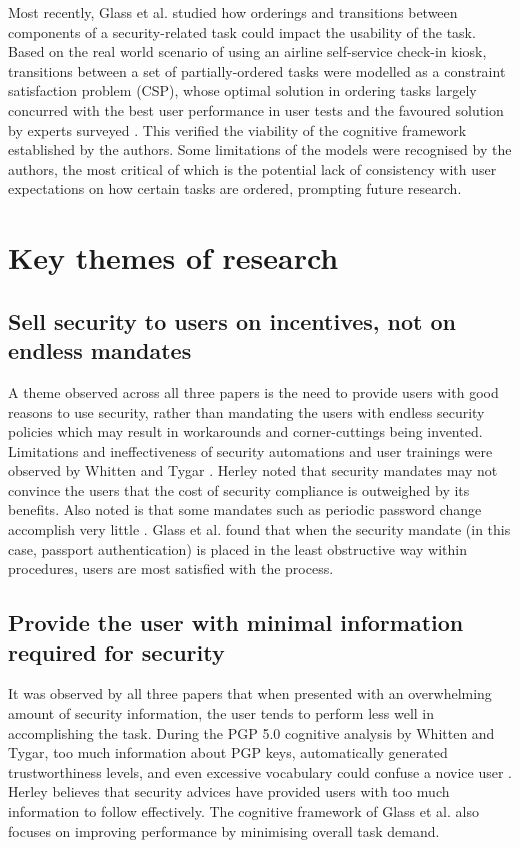 \documentclass[11pt]{article}
\begin{document}
Most recently, Glass et al. \cite{glass2016usability} studied how orderings and transitions between components of a security-related task could impact the usability of the task. Based on the real world scenario of using an airline self-service check-in kiosk, transitions between a set of partially-ordered tasks were modelled as a constraint satisfaction problem (CSP), whose optimal solution in ordering tasks largely concurred with the best user performance in user tests and the favoured solution by experts surveyed \cite[Fig. 7]{glass2016usability}. This verified the viability of the cognitive framework established by the authors. Some limitations of the models were recognised by the authors, the most critical of which is the potential lack of consistency with user expectations on how certain tasks are ordered, prompting future research.

\section{Key themes of research}

\subsection{Sell security to users on incentives, not on endless mandates}

A theme observed across all three papers is the need to provide users with good reasons to use security, rather than mandating the users with endless security policies which may result in workarounds and corner-cuttings being invented. Limitations and ineffectiveness of security automations and user trainings were observed by Whitten and Tygar \cite[Sec. 1]{whitten1999johnny}. Herley noted that security mandates may not convince the users that the cost of security compliance is outweighed by its benefits. Also noted is that some mandates such as periodic password change accomplish very little \cite[1.3, 2.2]{herley2014more}. Glass et al. \cite[Sec. VII]{glass2016usability} found that when the security mandate (in this case, passport authentication) is placed in the least obstructive way within procedures, users are most satisfied with the process.

\subsection{Provide the user with minimal information required for security}

It was observed by all three papers that when presented with an overwhelming amount of security information, the user tends to perform less well in accomplishing the task. During the PGP 5.0 cognitive analysis by Whitten and Tygar, too much information about PGP keys, automatically generated trustworthiness levels, and even excessive vocabulary could confuse a novice user \cite[4.6, 4.7]{whitten1999johnny}. Herley \cite[2.1]{herley2014more} believes that security advices have provided users with too much information to follow effectively. The cognitive framework of Glass et al. \cite[III. D.]{glass2016usability} also focuses on improving performance by minimising overall task demand.
\end{document}
